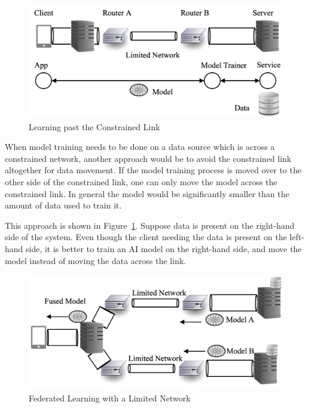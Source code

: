 
\begin{figure}[htbp]
\centering
\includegraphics[height=2in] {chapters/chap_net_limited/chap_net_figures/fig4.png}
\caption{Learning past the Constrained Link}
\label{fig:chap_net:edge_learn}
\end{figure}


When model training needs to be done on a data source which is across a constrained network, another approach would be to avoid the constrained link altogether for data movement. If the model training process is moved over to the other side of the constrained link, one can only move the model across the constrained link. In general the model would be significantly smaller than the amount of data used to train it. 

This approach is shown in Figure~\ref{fig:chap_net:edge_learn}. Suppose data is present on the right-hand side of the system. Even though the client needing the data is present on the left-hand side, it is better to train an AI model on the right-hand side, and move the model instead of moving the data across the link. 

\begin{figure}[htbp]
\centering
\includegraphics[height=2in] {chapters/chap_net_limited/chap_net_figures/fig5.png}
\caption{Federated Learning with a Limited Network}
\label{fig:chap_net:fedlearn}
\end{figure}


